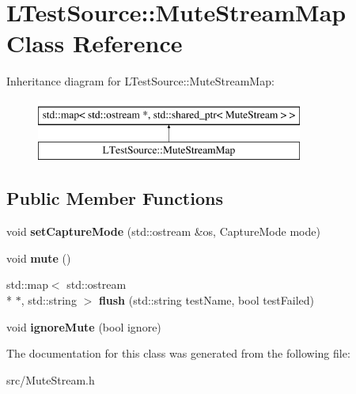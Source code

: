 \hypertarget{class_l_test_source_1_1_mute_stream_map}{\section{L\-Test\-Source\-:\-:Mute\-Stream\-Map Class Reference}
\label{class_l_test_source_1_1_mute_stream_map}
}
Inheritance diagram for L\-Test\-Source\-:\-:Mute\-Stream\-Map\-:\begin{figure}[H]
\begin{center}
\leavevmode
\includegraphics[height=2.000000cm]{class_l_test_source_1_1_mute_stream_map}
\end{center}
\end{figure}
\subsection*{Public Member Functions}
\begin{DoxyCompactItemize}
\item 
\hypertarget{class_l_test_source_1_1_mute_stream_map_aa88056f14a8251efd34522a9ae64bde2}{void {\bfseries set\-Capture\-Mode} (std\-::ostream \&os, Capture\-Mode mode)}\label{class_l_test_source_1_1_mute_stream_map_aa88056f14a8251efd34522a9ae64bde2}

\item 
\hypertarget{class_l_test_source_1_1_mute_stream_map_a762abcced7d23563b89118ad50ebc6d9}{void {\bfseries mute} ()}\label{class_l_test_source_1_1_mute_stream_map_a762abcced7d23563b89118ad50ebc6d9}

\item 
\hypertarget{class_l_test_source_1_1_mute_stream_map_a8f9ae98e4cc1eda66a8c733b9a7befd0}{std\-::map$<$ std\-::ostream \\*
$\ast$, std\-::string $>$ {\bfseries flush} (std\-::string test\-Name, bool test\-Failed)}\label{class_l_test_source_1_1_mute_stream_map_a8f9ae98e4cc1eda66a8c733b9a7befd0}

\item 
\hypertarget{class_l_test_source_1_1_mute_stream_map_a8d15e54006a08b6347af84bcefedc3dc}{void {\bfseries ignore\-Mute} (bool ignore)}\label{class_l_test_source_1_1_mute_stream_map_a8d15e54006a08b6347af84bcefedc3dc}

\end{DoxyCompactItemize}


The documentation for this class was generated from the following file\-:\begin{DoxyCompactItemize}
\item 
src/Mute\-Stream.\-h\end{DoxyCompactItemize}
